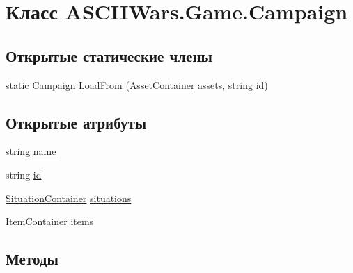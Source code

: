 \hypertarget{class_a_s_c_i_i_wars_1_1_game_1_1_campaign}{}\section{Класс A\+S\+C\+I\+I\+Wars.\+Game.\+Campaign}
\label{class_a_s_c_i_i_wars_1_1_game_1_1_campaign}
\subsection*{Открытые статические члены}
\begin{DoxyCompactItemize}
\item 
static \hyperlink{class_a_s_c_i_i_wars_1_1_game_1_1_campaign}{Campaign} \hyperlink{class_a_s_c_i_i_wars_1_1_game_1_1_campaign_a443ecc2c7e3665529ad8ac79561ef5f5}{Load\+From} (\hyperlink{class_a_s_c_i_i_wars_1_1_game_1_1_asset_container}{Asset\+Container} assets, string \hyperlink{class_a_s_c_i_i_wars_1_1_game_1_1_campaign_a1ef983b8a95909958e2b0fcf90f1f62f}{id})
\end{DoxyCompactItemize}
\subsection*{Открытые атрибуты}
\begin{DoxyCompactItemize}
\item 
string \hyperlink{class_a_s_c_i_i_wars_1_1_game_1_1_campaign_a8d6d836c7cd3c524f1f01b2eedba5619}{name}
\item 
string \hyperlink{class_a_s_c_i_i_wars_1_1_game_1_1_campaign_a1ef983b8a95909958e2b0fcf90f1f62f}{id}
\item 
\hyperlink{class_a_s_c_i_i_wars_1_1_game_1_1_situation_container}{Situation\+Container} \hyperlink{class_a_s_c_i_i_wars_1_1_game_1_1_campaign_a5957bb2bca04dfed0b24eda637f0afad}{situations}
\item 
\hyperlink{class_a_s_c_i_i_wars_1_1_game_1_1_item_container}{Item\+Container} \hyperlink{class_a_s_c_i_i_wars_1_1_game_1_1_campaign_a22844063638b6252dc47c327c19432fc}{items}
\end{DoxyCompactItemize}


\subsection{Методы}
\hypertarget{class_a_s_c_i_i_wars_1_1_game_1_1_campaign_a443ecc2c7e3665529ad8ac79561ef5f5}{}\label{class_a_s_c_i_i_wars_1_1_game_1_1_campaign_a443ecc2c7e3665529ad8ac79561ef5f5} 
